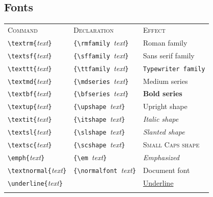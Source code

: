 \documentclass[fs, footer]{latex4ei}
\let\code\lstinline
\begin{document}
\begin{multicols*}{4}
{	\subsection{Fonts}
	\begin{tabular*}{\columnwidth}{l@{\extracolsep\fill}ll} \trule
	\textsc{Command} & \textsc{Declaration} & \textsc{Effect} \\ \mrule
	\code!\textrm{!\textit{text}\code!}!                    & %
			\code!{\rmfamily !\textit{text}\code!}!               & %
			\textrm{Roman family} \\
	\code!\textsf{!\textit{text}\code!}!                    & %
			\code!{\sffamily !\textit{text}\code!}!               & %
			\textsf{Sans serif family} \\
	\code!\texttt{!\textit{text}\code!}!                    & %
			\code!{\ttfamily !\textit{text}\code!}!               & %
			\texttt{Typewriter family} \\
	\code!\textmd{!\textit{text}\code!}!                    & %
			\code!{\mdseries !\textit{text}\code!}!               & %
			\textmd{Medium series} \\
	\code!\textbf{!\textit{text}\code!}!                    & %
			\code!{\bfseries !\textit{text}\code!}!               & %
			\textbf{Bold series} \\
	\code!\textup{!\textit{text}\code!}!                    & %
			\code!{\upshape !\textit{text}\code!}!               & %
			\textup{Upright shape} \\
	\code!\textit{!\textit{text}\code!}!                    & %
			\code!{\itshape !\textit{text}\code!}!               & %
			\textit{Italic shape} \\
	\code!\textsl{!\textit{text}\code!}!                    & %
			\code!{\slshape !\textit{text}\code!}!               & %
			\textsl{Slanted shape} \\
	\code!\textsc{!\textit{text}\code!}!                    & %
			\code!{\scshape !\textit{text}\code!}!               & %
			\textsc{Small Caps shape} \\
	\code!\emph{!\textit{text}\code!}!                      & %
			\code!{\em !\textit{text}\code!}!               & %
			\emph{Emphasized} \\
	\code!\textnormal{!\textit{text}\code!}!                & %
			\code!{\normalfont !\textit{text}\code!}!       & %
			\textnormal{Document font} \\
	\code!\underline{!\textit{text}\code!}!                 & %
															& %
			\underline{Underline}\\ \brule
	\end{tabular*}
}



\end{multicols*}
\end{document}
